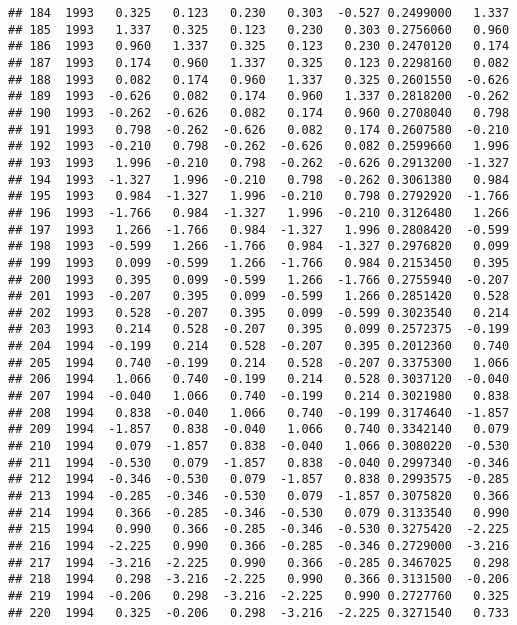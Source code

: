\documentclass[]{article}
\begin{document}
\begin{verbatim}
## 184  1993   0.325   0.123   0.230   0.303  -0.527 0.2499000   1.337
## 185  1993   1.337   0.325   0.123   0.230   0.303 0.2756060   0.960
## 186  1993   0.960   1.337   0.325   0.123   0.230 0.2470120   0.174
## 187  1993   0.174   0.960   1.337   0.325   0.123 0.2298160   0.082
## 188  1993   0.082   0.174   0.960   1.337   0.325 0.2601550  -0.626
## 189  1993  -0.626   0.082   0.174   0.960   1.337 0.2818200  -0.262
## 190  1993  -0.262  -0.626   0.082   0.174   0.960 0.2708040   0.798
## 191  1993   0.798  -0.262  -0.626   0.082   0.174 0.2607580  -0.210
## 192  1993  -0.210   0.798  -0.262  -0.626   0.082 0.2599660   1.996
## 193  1993   1.996  -0.210   0.798  -0.262  -0.626 0.2913200  -1.327
## 194  1993  -1.327   1.996  -0.210   0.798  -0.262 0.3061380   0.984
## 195  1993   0.984  -1.327   1.996  -0.210   0.798 0.2792920  -1.766
## 196  1993  -1.766   0.984  -1.327   1.996  -0.210 0.3126480   1.266
## 197  1993   1.266  -1.766   0.984  -1.327   1.996 0.2808420  -0.599
## 198  1993  -0.599   1.266  -1.766   0.984  -1.327 0.2976820   0.099
## 199  1993   0.099  -0.599   1.266  -1.766   0.984 0.2153450   0.395
## 200  1993   0.395   0.099  -0.599   1.266  -1.766 0.2755940  -0.207
## 201  1993  -0.207   0.395   0.099  -0.599   1.266 0.2851420   0.528
## 202  1993   0.528  -0.207   0.395   0.099  -0.599 0.3023540   0.214
## 203  1993   0.214   0.528  -0.207   0.395   0.099 0.2572375  -0.199
## 204  1994  -0.199   0.214   0.528  -0.207   0.395 0.2012360   0.740
## 205  1994   0.740  -0.199   0.214   0.528  -0.207 0.3375300   1.066
## 206  1994   1.066   0.740  -0.199   0.214   0.528 0.3037120  -0.040
## 207  1994  -0.040   1.066   0.740  -0.199   0.214 0.3021980   0.838
## 208  1994   0.838  -0.040   1.066   0.740  -0.199 0.3174640  -1.857
## 209  1994  -1.857   0.838  -0.040   1.066   0.740 0.3342140   0.079
## 210  1994   0.079  -1.857   0.838  -0.040   1.066 0.3080220  -0.530
## 211  1994  -0.530   0.079  -1.857   0.838  -0.040 0.2997340  -0.346
## 212  1994  -0.346  -0.530   0.079  -1.857   0.838 0.2993575  -0.285
## 213  1994  -0.285  -0.346  -0.530   0.079  -1.857 0.3075820   0.366
## 214  1994   0.366  -0.285  -0.346  -0.530   0.079 0.3133540   0.990
## 215  1994   0.990   0.366  -0.285  -0.346  -0.530 0.3275420  -2.225
## 216  1994  -2.225   0.990   0.366  -0.285  -0.346 0.2729000  -3.216
## 217  1994  -3.216  -2.225   0.990   0.366  -0.285 0.3467025   0.298
## 218  1994   0.298  -3.216  -2.225   0.990   0.366 0.3131500  -0.206
## 219  1994  -0.206   0.298  -3.216  -2.225   0.990 0.2727760   0.325
## 220  1994   0.325  -0.206   0.298  -3.216  -2.225 0.3271540   0.733

\end{verbatim}
\end{document}
